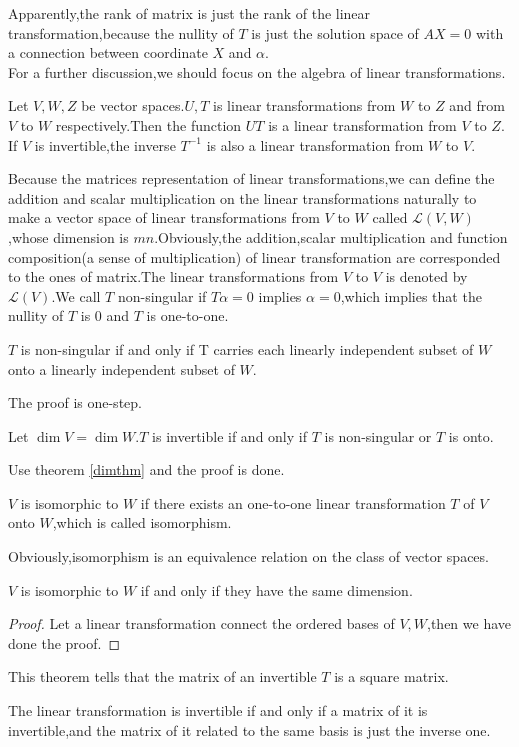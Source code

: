 \documentclass{article}
\begin{document}
Apparently,the rank of matrix is just the rank of the linear transformation,because the nullity of $T$ is just the solution space of $AX=0$ with a connection between coordinate $X$ and $\alpha$.\\
For a further discussion,we should focus on the algebra of linear transformations.
\begin{thm}
	Let $V,W,Z$ be vector spaces.$U,T$ is linear transformations from $W$ to $Z$ and from $V$ to $W$ respectively.Then the function $UT$ is a linear transformation from $V$ to $Z$. If $V$ is invertible,the inverse $T^{-1}$ is also a linear transformation from $W$ to $V$.
\end{thm}
Because the matrices representation of linear transformations,we can define the addition and scalar multiplication on the linear transformations naturally to make a vector space of linear transformations from $V$ to $W$ called $\mathcal{L}(V,W)$,whose dimension is $mn$.Obviously,the addition,scalar multiplication and function composition(a sense of multiplication) of linear transformation are corresponded to the ones of matrix.The linear transformations from $V$ to $V$ is denoted by $\mathcal{L}(V)$.We call $T$ non-singular if $T\alpha=0$ implies $\alpha=0$,which implies that the nullity of $T$ is $0$ and $T$ is one-to-one.
\begin{thm}
	$T$ is non-singular if and only if T carries each linearly independent subset of $W$ onto a linearly independent subset of $W$. 
\end{thm}
The proof is one-step.
\begin{thm}
	Let $\dim V=\dim W$.$T$ is invertible if and only if $T$ is non-singular or $T$ is onto.
\end{thm}
Use theorem \ref{dimthm} and the proof is done.
\begin{dde}
	$V$ is isomorphic to $W$ if there exists an one-to-one linear transformation $T$ of $V$ onto $W$,which is called isomorphism.
\end{dde}
Obviously,isomorphism is an equivalence relation on the class of vector spaces.
\begin{thm}
	$V$ is isomorphic to $W$ if and only if they have the same dimension.
\end{thm}
\begin{proof}
	Let a linear transformation connect the ordered bases of $V,W$,then we have done the proof.
\end{proof}
This theorem tells that the matrix of an invertible $T$ is a square matrix.
\begin{thm}
	The linear transformation is invertible if and only if a matrix of it is invertible,and the matrix of it related to the same basis is just the inverse one.
\end{thm}
\end{document}
